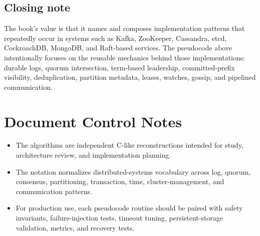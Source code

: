 \documentclass[10pt,letterpaper]{article}
\begin{document}
\subsection*{Closing note}

The book's value is that it names and composes implementation patterns that repeatedly occur in systems such as Kafka, ZooKeeper, Cassandra, etcd, CockroachDB, MongoDB, and Raft-based services. The pseudocode above intentionally focuses on the reusable mechanics behind those implementations: durable logs, quorum intersection, term-based leadership, committed-prefix visibility, deduplication, partition metadata, leases, watches, gossip, and pipelined communication.

\clearpage
\section*{Document Control Notes}
{}
\begin{itemize}
\item The algorithms are independent C-like reconstructions intended for study, architecture review, and implementation planning.
\item The notation normalizes distributed-systems vocabulary across log, quorum, consensus, partitioning, transaction, time, cluster-management, and communication patterns.
\item For production use, each pseudocode routine should be paired with safety invariants, failure-injection tests, timeout tuning, persistent-storage validation, metrics, and recovery tests.
\end{itemize}
\end{document}
